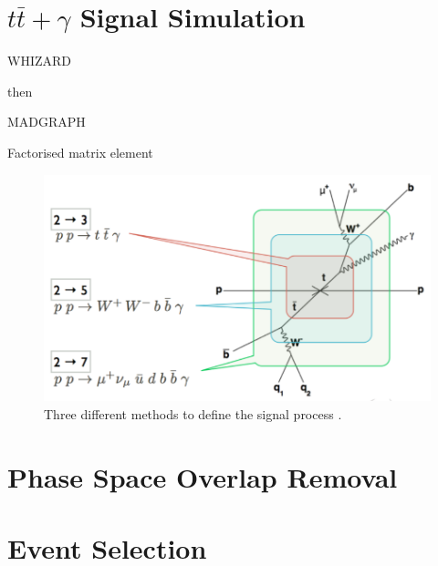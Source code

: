 \section{$t\bar{t}+\gamma$ Signal Simulation}

WHIZARD

then

MADGRAPH

Factorised matrix element 

\begin{figure}\label{fig-MatrixElementCalculation}
\includegraphics[width=\textwidth]{Figures/MatrixElementCalculation.png}
\caption{Three different methods to define the signal process \cite{heinerthesis}.}
\end{figure}

\section{Phase Space Overlap Removal}

\section{Event Selection}